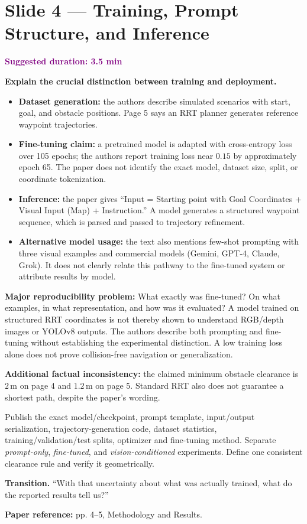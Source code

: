 \documentclass[11pt,a4paper]{article}
\newcommand{\slide}[3]{\clearpage\section*{Slide #1 --- #2}\textcolor{purple}{\textbf{Suggested duration: #3}}\par\medskip}
\newcommand{\source}[1]{\par\small\textcolor{deep}{\textbf{Paper reference:} #1}\normalsize}
\begin{document}
\slide{4}{Training, Prompt Structure, and Inference}{3.5 min}
\textbf{Explain the crucial distinction between training and deployment.}
\begin{itemize}
\item \textbf{Dataset generation:} the authors describe simulated scenarios with start, goal, and obstacle positions. Page 5 says an RRT planner generates reference waypoint trajectories.
\item \textbf{Fine-tuning claim:} a pretrained model is adapted with cross-entropy loss over 105 epochs; the authors report training loss near $0.15$ by approximately epoch 65. The paper does not identify the exact model, dataset size, split, or coordinate tokenization.
\item \textbf{Inference:} the paper gives ``Input = Starting point with Goal Coordinates + Visual Input (Map) + Instruction.'' A model generates a structured waypoint sequence, which is parsed and passed to trajectory refinement.
\item \textbf{Alternative model usage:} the text also mentions few-shot prompting with three visual examples and commercial models (Gemini, GPT-4, Claude, Grok). It does not clearly relate this pathway to the fine-tuned system or attribute results by model.
\end{itemize}
\begin{critique}
\textbf{Major reproducibility problem:} What exactly was fine-tuned? On what examples, in what representation, and how was it evaluated? A model trained on structured RRT coordinates is not thereby shown to understand RGB/depth images or YOLOv8 outputs. The authors describe both prompting and fine-tuning without establishing the experimental distinction. A low training loss alone does not prove collision-free navigation or generalization.

\textbf{Additional factual inconsistency:} the claimed minimum obstacle clearance is $2\,$m on page 4 and $1.2\,$m on page 5. Standard RRT also does not guarantee a shortest path, despite the paper's wording.
\end{critique}
\begin{repair}
Publish the exact model/checkpoint, prompt template, input/output serialization, trajectory-generation code, dataset statistics, training/validation/test splits, optimizer and fine-tuning method. Separate \emph{prompt-only}, \emph{fine-tuned}, and \emph{vision-conditioned} experiments. Define one consistent clearance rule and verify it geometrically.
\end{repair}
\textbf{Transition.} ``With that uncertainty about what was actually trained, what do the reported results tell us?''
\source{pp. 4--5, Methodology and Results.}
\end{document}
